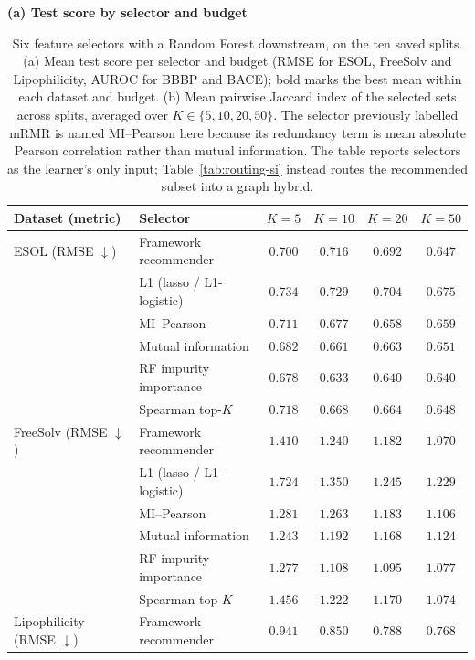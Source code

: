 \documentclass[10pt,a4paper]{article}
\renewcommand{\thetable}{S\arabic{table}}
\begin{document}
\begin{table}[H]
\renewcommand{\thetable}{S6}
\caption{Six feature selectors with a Random Forest downstream, on the ten saved splits. (a) Mean test score per selector and budget (RMSE for ESOL, FreeSolv and Lipophilicity, AUROC for BBBP and BACE); bold marks the best mean within each dataset and budget. (b) Mean pairwise Jaccard index of the selected sets across splits, averaged over $K\in\{5,10,20,50\}$. The selector previously labelled mRMR is named MI--Pearson here because its redundancy term is mean absolute Pearson correlation rather than mutual information. The table reports selectors as the learner's only input; Table~\ref{tab:routing-si} instead routes the recommended subset into a graph hybrid.}\label{tab:sel-full}
\centering\scriptsize
\setlength{\tabcolsep}{4pt}
\textbf{(a) Test score by selector and budget}\par\smallskip
\begin{tabular}{@{}llcccc@{}}
\toprule
Dataset (metric) & Selector & $K=5$ & $K=10$ & $K=20$ & $K=50$ \\
\midrule
ESOL (RMSE $\downarrow$) & Framework recommender & $0.700$ & $0.716$ & $0.692$ & $0.647$ \\
 & L1 (lasso / L1-logistic) & $0.734$ & $0.729$ & $0.704$ & $0.675$ \\
 & MI--Pearson & $0.711$ & $0.677$ & $0.658$ & $0.659$ \\
 & Mutual information & $0.682$ & $0.661$ & $0.663$ & $0.651$ \\
 & RF impurity importance & $\mathbf{0.678}$ & $\mathbf{0.633}$ & $\mathbf{0.640}$ & $\mathbf{0.640}$ \\
 & Spearman top-$K$ & $0.718$ & $0.668$ & $0.664$ & $0.648$ \\
\midrule
FreeSolv (RMSE $\downarrow$) & Framework recommender & $1.410$ & $1.240$ & $1.182$ & $\mathbf{1.070}$ \\
 & L1 (lasso / L1-logistic) & $1.724$ & $1.350$ & $1.245$ & $1.229$ \\
 & MI--Pearson & $1.281$ & $1.263$ & $1.183$ & $1.106$ \\
 & Mutual information & $\mathbf{1.243}$ & $1.192$ & $1.168$ & $1.124$ \\
 & RF impurity importance & $1.277$ & $\mathbf{1.108}$ & $\mathbf{1.095}$ & $1.077$ \\
 & Spearman top-$K$ & $1.456$ & $1.222$ & $1.170$ & $1.074$ \\
\midrule
Lipophilicity (RMSE $\downarrow$) & Framework recommender & $0.941$ & $0.850$ & $0.788$ & $0.768$ \\

\end{tabular}
\end{table}
\end{document}
